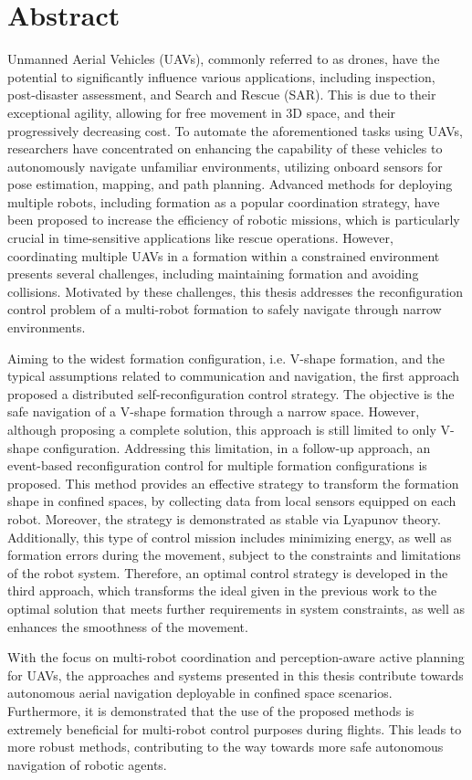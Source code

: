 \chapter*{Abstract}

Unmanned Aerial Vehicles (UAVs), commonly referred to as drones, have the potential to significantly influence various applications, including inspection, post-disaster assessment, and Search and Rescue (SAR). This is due to their exceptional agility, allowing for free movement in 3D space, and their progressively decreasing cost. To automate the aforementioned tasks using UAVs, researchers have concentrated on enhancing the capability of these vehicles to autonomously navigate unfamiliar environments, utilizing onboard sensors for pose estimation, mapping, and path planning. Advanced methods for deploying multiple robots, including formation as a popular coordination strategy, have been proposed to increase the efficiency of robotic missions, which is particularly crucial in time-sensitive applications like rescue operations. However, coordinating multiple UAVs in a formation within a constrained environment presents several challenges, including maintaining formation and avoiding collisions. Motivated by these challenges, this thesis addresses the reconfiguration control problem of a multi-robot formation to safely navigate through narrow environments.

Aiming to the widest formation configuration, i.e. V-shape formation, and the typical assumptions related to communication and navigation, the first approach proposed a distributed self-reconfiguration control strategy. The objective is the safe navigation of a V-shape formation through a narrow space. However, although proposing a complete solution, this approach is still limited to only V-shape configuration. Addressing this limitation, in a follow-up approach, an event-based reconfiguration control for multiple formation configurations is proposed. This method provides an effective strategy to transform the formation shape in confined spaces, by collecting data from local sensors equipped on each robot. Moreover, the strategy is demonstrated as stable via Lyapunov theory. Additionally, this type of control mission includes minimizing energy, as well as formation errors during the movement, subject to the constraints and limitations of the robot system. Therefore, an optimal control strategy is developed in the third approach, which transforms the ideal given in the previous work to the optimal solution that meets further requirements in system constraints, as well as enhances the smoothness of the movement.

With the focus on multi-robot coordination and perception-aware active planning for UAVs, the approaches and systems presented in this thesis contribute towards autonomous aerial navigation deployable in confined space scenarios. Furthermore, it is demonstrated that the use of the proposed methods is extremely beneficial for multi-robot control purposes during flights. This leads to more robust methods, contributing to the way towards more safe autonomous navigation of robotic agents.